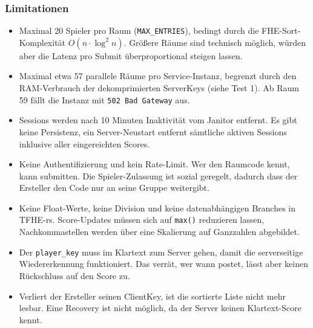 \subsubsection{Limitationen}
\begin{itemize}
    \item Maximal 20 Spieler pro Raum (\texttt{MAX\_ENTRIES}), bedingt durch die FHE-Sort-Komplexität $O(n \cdot \log^2 n)$. Größere Räume sind technisch möglich, würden aber die Latenz pro Submit überproportional steigen lassen.
    \item Maximal etwa 57 parallele Räume pro Service-Instanz, begrenzt durch den RAM-Verbrauch der dekomprimierten ServerKeys (siehe Test 1). Ab Raum 59 fällt die Instanz mit \texttt{502 Bad Gateway} aus.
    \item Sessions werden nach 10 Minuten Inaktivität vom Janitor entfernt. Es gibt keine Persistenz, ein Server-Neustart entfernt sämtliche aktiven Sessions inklusive aller eingereichten Scores.
    \item Keine Authentifizierung und kein Rate-Limit. Wer den Raumcode kennt, kann submitten. Die Spieler-Zulassung ist sozial geregelt, dadurch dass der Ersteller den Code nur an seine Gruppe weitergibt.
    \item Keine Float-Werte, keine Division und keine datenabhängigen Branches in TFHE-rs. Score-Updates müssen sich auf \texttt{max()} reduzieren lassen, Nachkommastellen werden über eine Skalierung auf Ganzzahlen abgebildet.
    \item Der \texttt{player\_key} muss im Klartext zum Server gehen, damit die serverseitige Wiedererkennung funktioniert. Das verrät, wer wann postet, lässt aber keinen Rückschluss auf den Score zu.
    \item Verliert der Ersteller seinen ClientKey, ist die sortierte Liste nicht mehr lesbar. Eine Recovery ist nicht möglich, da der Server keinen Klartext-Score kennt.
\end{itemize}
